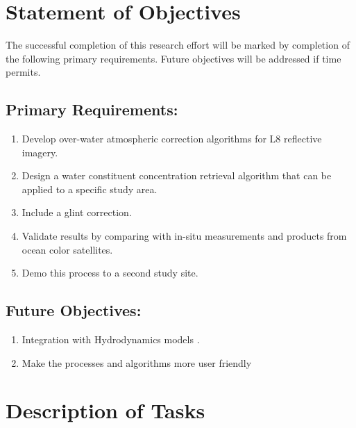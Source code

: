 \section{Statement of Objectives}
\label{sec:objectives}
The successful completion of this research effort will be marked by completion of the following primary requirements. Future objectives will be addressed if time permits.

\subsection{Primary Requirements:}
\begin{enumerate}
	\item Develop over-water atmospheric correction algorithms for L8 reflective imagery.
	\item Design a water constituent concentration retrieval algorithm that can be applied to a specific study area.
	\item { Include a glint correction.} 
	\item Validate results by comparing with in-situ measurements and products from ocean color satellites.
	\item Demo this process to a second study site.
\end{enumerate}

\subsection{Future Objectives:}
\begin{enumerate}
	\item Integration with Hydrodynamics models  .
	\item Make the processes and algorithms more user friendly 
\end{enumerate}
\section{Description of Tasks}
\label{sec:tasks}

